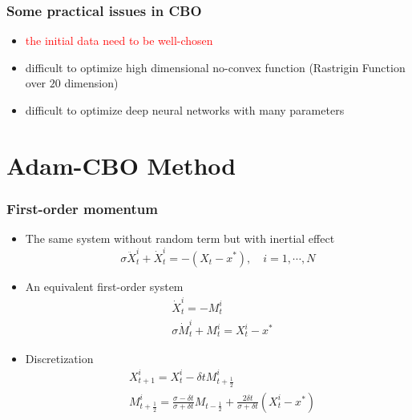 \documentclass{beamer}
\begin{document}
\begin{frame}
	\frametitle{Some practical issues in CBO}
	\begin{itemize}
		\item \textcolor{red}{the initial data need to be well-chosen}
		\item difficult to optimize high dimensional no-convex function (Rastrigin Function over $20$ dimension)
		\item difficult to optimize deep neural networks with many parameters
	\end{itemize}
\end{frame}
\section{Adam-CBO Method}
\begin{frame}
	\frametitle{First-order momentum}
	
	\begin{itemize}
		\item[] The same system without random term but with inertial effect
		\begin{equation*}
		\sigma \ddot X^i_t + \dot X^i_t = -(X_t- x^*) , \quad i=1,\cdots,N
		\end{equation*}
		\item[] An equivalent first-order system
		\begin{align*}
		&\dot X_t^i = -M_t^i \\
		&\sigma \dot M_t^i + M_t^i = X_t^i - x^*
		\end{align*}
		\item[] Discretization
		\begin{align*}
		&X^i_{t+1} = X_t^i -\delta t M^i_{t+\frac{1}{2}}\\
		&M^i_{t+\frac{1}{2}} = \frac{\sigma - \delta t}{\sigma+ \delta t}M_{t-\frac{1}{2}} + \frac{2\delta t}{\sigma  + \delta t } (X_t^i - x^*)
		\end{align*}
	\end{itemize}

\end{frame}
\end{document}
